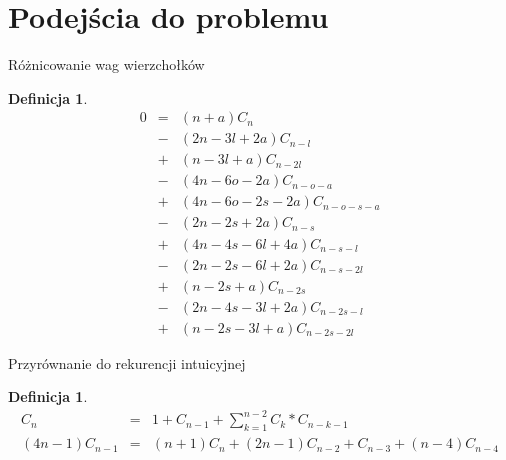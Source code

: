 \documentclass[final]{beamer}
\theoremstyle{bluetheorem}
\theoremstyle{bluetheorem}
\newtheorem{mydefinition}[mytheorem]{Definicja}
\theoremstyle{greentheorem}
\begin{document}
\section{Podejścia do problemu}

\begin{frame}{Różnicowanie wag wierzchołków}
    \begin{mydefinition}
        \[\begin{array}{rcl}
                0 &=& (n + a)C_{n} \\
                  &-& (2n - 3l + 2a)C_{n-l} \\
                  &+& (n - 3l + a)C_{n-2l} \\
                  &-& (4n - 6o - 2a)C_{n-o-a} \\
                  &+& (4n - 6o - 2s - 2a)C_{n-o-s-a} \\
                  &-& (2n - 2s + 2a)C_{n-s} \\
                  &+& (4n - 4s - 6l + 4a)C_{n-s-l} \\
                  &-& (2n - 2s - 6l + 2a)C_{n-s-2l} \\
                  &+& (n - 2s + a)C_{n-2s} \\
                  &-& (2n - 4s - 3l + 2a)C_{n-2s-l} \\
                  &+& (n - 2s - 3l + a)C_{n-2s-2l}
        \end{array}\]
    \end{mydefinition}
\end{frame}

\begin{frame}{Przyrównanie do rekurencji intuicyjnej}
    \begin{mydefinition}
        \small
        \[\begin{array}{rcl}
                C_n &=& 1 + C_{n - 1} + \sum_{k=1}^{n-2}C_k*C_{n - k - 1} \\
                (4n - 1)C_{n - 1} &=& (n + 1)C_n + (2n - 1)C_{n - 2} + C_{n - 3} + (n - 4)C_{n - 4}
        \end{array}\]
    \end{mydefinition}
\end{frame}
\end{document}
